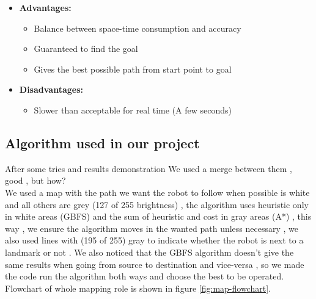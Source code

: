 \documentclass[12pt]{book}
\begin{document}
\begin{itemize}
	\item \textbf{Advantages:}
	\begin{itemize}
		\item Balance between space-time consumption and accuracy
		\item Guaranteed to find the goal
		\item Gives the best possible path from start point to goal
		
		
	\end{itemize}
	\item \textbf{Disadvantages:}
	\begin{itemize}
		\item Slower than acceptable for real time (A few seconds)
		
	\end{itemize}
\end{itemize}

\subsection{Algorithm used in our project}
After some tries and results demonstration We used a merge between them , good , but how?\\
We used a map with the path we want the robot to follow when possible is white and all others are grey (127 of 255 brightness) , the algorithm uses heuristic only in white areas (GBFS) and the sum of heuristic and cost in gray areas (A*) , this way , we ensure the algorithm moves in the wanted path unless necessary , we also used lines with (195 of 255) gray to indicate whether the robot is next to a landmark or not .
We also noticed that the GBFS algorithm doesn’t give the same results when going from source to destination and vice-versa , so we made the code run the algorithm both ways and choose the best to be operated.
Flowchart of whole mapping role is shown in figure \ref{fig:map-flowchart}.
\end{document}
